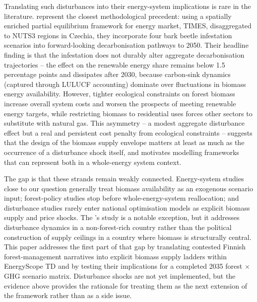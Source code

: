 \documentclass{article}
\begin{document}
Translating such disturbances into their energy-system implications is rare in the literature. \citet{reckaRoleBiomassDecarbonisation2023} represent the closest methodological precedent: using a spatially enriched partial equilibrium framework for energy market, TIMES, disaggregated to NUTS3 regions in Czechia, they incorporate four bark beetle infestation scenarios into forward-looking decarbonisation pathways to 2050. Their headline finding is that the infestation does not durably alter aggregate decarbonisation trajectories -- the effect on the renewable energy share remains below 1.5 percentage points and dissipates after 2030, because carbon-sink dynamics (captured through LULUCF accounting) dominate over fluctuations in biomass energy availability. However, tighter ecological constraints on forest biomass increase overall system costs and worsen the prospects of meeting renewable energy targets, while restricting biomass to residential uses forces other sectors to substitute with natural gas. This asymmetry -- a modest aggregate disturbance effect but a real and persistent cost penalty from ecological constraints -- suggests that the design of the biomass supply envelope matters at least as much as the occurrence of a disturbance shock itself, and motivates modelling frameworks that can represent both in a whole-energy system context.

The gap is that these strands remain weakly connected. Energy-system studies close to our question generally treat biomass availability as an exogenous scenario input; forest-policy studies stop before whole-energy-system reallocation; and disturbance studies rarely enter national optimisation models as explicit biomass supply and price shocks. The \cite{reckaRoleBiomassDecarbonisation2023}'s study is a notable exception, but it addresses disturbance dynamics in a non-forest-rich country rather than the political construction of supply ceilings in a country where biomass is structurally central. This paper addresses the first part of that gap by translating contested Finnish forest-management narratives into explicit biomass supply ladders within EnergyScope TD and by testing their implications for a completed 2035 forest \(\times\) GHG scenario matrix. Disturbance shocks are not yet implemented, but the evidence above provides the rationale for treating them as the next extension of the framework rather than as a side issue.
\end{document}
